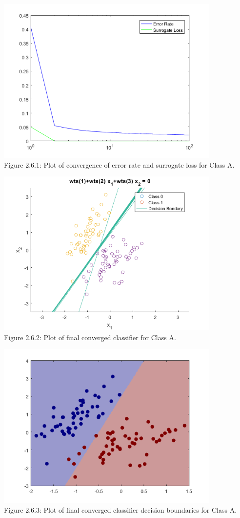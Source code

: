 \documentclass[]{report}   %
\begin{document}
\begin{center}
	\includegraphics[width=30em,keepaspectratio]{2_6_Figure_1.png}\\
	{Figure 2.6.1: Plot of convergence of error rate and surrogate loss for Class A.}
\end{center} 
\begin{center}
	\includegraphics[width=30em,keepaspectratio]{2_6_Figure_2.png}\\
	{Figure 2.6.2: Plot of final converged classifier for Class A.}
\end{center} 


\begin{center}
	\includegraphics[width=30em,keepaspectratio]{2_6_Figure_3.png}\\
	{Figure 2.6.3: Plot of final converged classifier decision boundaries for Class A.}
\end{center} 
\end{document}
